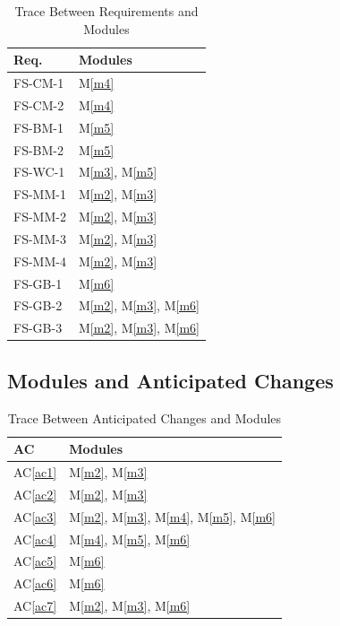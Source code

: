 \documentclass[12pt, titlepage]{article}
\newcommand{\acref}[1]{AC\ref{#1}}
\newcommand{\mref}[1]{M\ref{#1}}
\begin{document}
\begin{table}[H]
\centering
\begin{tabular}{p{} p{}}
\toprule
\textbf{Req.} & \textbf{Modules}\\
\midrule
FS-CM-1 & \mref{m4}\\
FS-CM-2 & \mref{m4}\\
FS-BM-1 & \mref{m5}\\
FS-BM-2 & \mref{m5}\\
FS-WC-1 & \mref{m3}, \mref{m5}\\
FS-MM-1 & \mref{m2}, \mref{m3}\\
FS-MM-2 & \mref{m2}, \mref{m3}\\
FS-MM-3 & \mref{m2}, \mref{m3}\\
FS-MM-4 & \mref{m2}, \mref{m3}\\
FS-GB-1 & \mref{m6}\\
FS-GB-2 & \mref{m2}, \mref{m3}, \mref{m6}\\
FS-GB-3 & \mref{m2}, \mref{m3}, \mref{m6}\\
\bottomrule
\end{tabular}

\caption{Trace Between Requirements and Modules}
\label{TblRT}
\end{table}

\subsection{Modules and Anticipated Changes}

\begin{table}[H]
\centering
\begin{tabular}{p{} p{}}
\toprule
\textbf{AC} & \textbf{Modules}\\
\midrule
\acref{ac1} & \mref{m2}, \mref{m3}\\
\acref{ac2} & \mref{m2}, \mref{m3}\\
\acref{ac3} & \mref{m2}, \mref{m3}, \mref{m4}, \mref{m5}, \mref{m6} \\
\acref{ac4} & \mref{m4}, \mref{m5}, \mref{m6}\\
\acref{ac5} & \mref{m6}\\
\acref{ac6} & \mref{m6}\\
\acref{ac7} & \mref{m2}, \mref{m3}, \mref{m6} \\
\bottomrule
\end{tabular}
\caption{Trace Between Anticipated Changes and Modules}
\label{TblACT}
\end{table}
\end{document}
